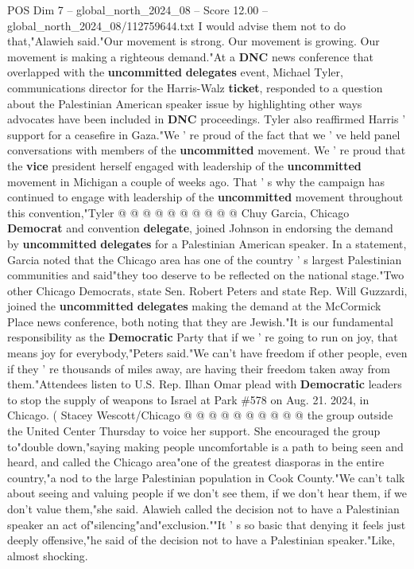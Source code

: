 \begin{textsample}{POS Dim 7 – global\_north\_2024\_08 – Score 12.00 – global\_north\_2024\_08/112759644.txt}
I would advise them not to do that,"Alawieh said."Our movement is strong.
Our movement is growing.
Our movement is making a righteous demand."At a \textbf{DNC} news conference that overlapped with the \textbf{uncommitted} \textbf{delegates} event, Michael Tyler, communications director for the Harris-Walz \textbf{ticket}, responded to a question about the Palestinian American speaker issue by highlighting other ways advocates have been included in \textbf{DNC} proceedings.
Tyler also reaffirmed Harris ' support for a ceasefire in Gaza."We ' re proud of the fact that we ' ve held panel conversations with members of the \textbf{uncommitted} movement.
We ' re proud that the \textbf{vice} president herself engaged with leadership of the \textbf{uncommitted} movement in Michigan a couple of weeks ago.
That ' s why the campaign has continued to engage with leadership of the \textbf{uncommitted} movement throughout this convention,"Tyler @ @ @ @ @ @ @ @ @ @ Chuy Garcia, Chicago \textbf{Democrat} and convention \textbf{delegate}, joined Johnson in endorsing the demand by \textbf{uncommitted} \textbf{delegates} for a Palestinian American speaker.
In a statement, Garcia noted that the Chicago area has one of the country ' s largest Palestinian communities and said"they too deserve to be reflected on the national stage."Two other Chicago Democrats, state Sen.
Robert Peters and state Rep.
Will Guzzardi, joined the \textbf{uncommitted} \textbf{delegates} making the demand at the McCormick Place news conference, both noting that they are Jewish."It is our fundamental responsibility as the \textbf{Democratic} Party that if we ' re going to run on joy, that means joy for everybody,"Peters said."We can't have freedom if other people, even if they ' re thousands of miles away, are having their freedom taken away from them."Attendees listen to U.S.
Rep.
Ilhan Omar plead with \textbf{Democratic} leaders to stop the supply of weapons to Israel at Park \#578 on Aug. 21. 2024, in Chicago. ( Stacey Wescott/Chicago @ @ @ @ @ @ @ @ @ @ the group outside the United Center Thursday to voice her support.
She encouraged the group to"double down,"saying making people uncomfortable is a path to being seen and heard, and called the Chicago area"one of the greatest diasporas in the entire country,"a nod to the large Palestinian population in Cook County."We can't talk about seeing and valuing people if we don't see them, if we don't hear them, if we don't value them,"she said.
Alawieh called the decision not to have a Palestinian speaker an act of"silencing"and"exclusion.""It ' s so basic that denying it feels just deeply offensive,"he said of the decision not to have a Palestinian speaker."Like, almost shocking.

\end{textsample}
